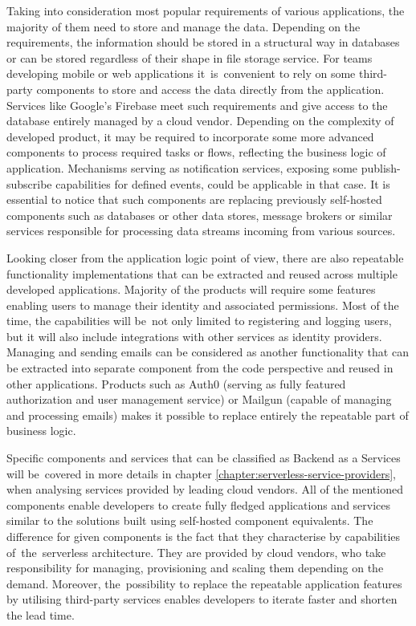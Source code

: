 Taking into consideration most popular requirements of various applications, the majority of them need to store and manage the data. Depending on the requirements, the information should be stored in a structural way in databases or can be stored regardless of their shape in file storage service. For teams developing mobile or web applications it~is~convenient to rely on some third-party components to store and access the data directly from the application. Services like Google's Firebase meet such requirements and give access to the database entirely managed by a cloud vendor. Depending on the complexity of developed product, it may be required to incorporate some more advanced components to process required tasks or flows, reflecting the business logic of application. Mechanisms serving as notification services, exposing some publish-subscribe capabilities for defined events, could be applicable in that case. It is essential to notice that such components are replacing previously self-hosted components such as databases or other data stores, message brokers or similar services responsible for processing data streams incoming from various sources.

Looking closer from the application logic point of view, there are also repeatable functionality implementations that can be extracted and reused across multiple developed applications. Majority of the products will require some features enabling users to manage their identity and associated permissions. Most of the time, the capabilities will be~not only limited to registering and logging users, but it will also include integrations with other services as identity providers. Managing and sending emails can be considered as another functionality that can be extracted into separate component from the code perspective and reused in other applications. Products such as Auth0 (serving as fully featured authorization and user management service) or Mailgun (capable of managing and processing emails) makes it possible to replace entirely the repeatable part of business logic.

Specific components and services that can be classified as Backend as a Services will be~covered in more details in chapter \ref{chapter:serverless-service-providers}, when analysing services provided by leading cloud vendors. All of the mentioned components enable developers to create fully fledged applications and services similar to the solutions built using self-hosted component equivalents. The difference for given components is the fact that they characterise by capabilities of~the~serverless architecture. They are provided by cloud vendors, who take responsibility for managing, provisioning and scaling them depending on the demand. Moreover, the~possibility to replace the repeatable application features by utilising third-party services enables developers to iterate faster and shorten the lead time.

